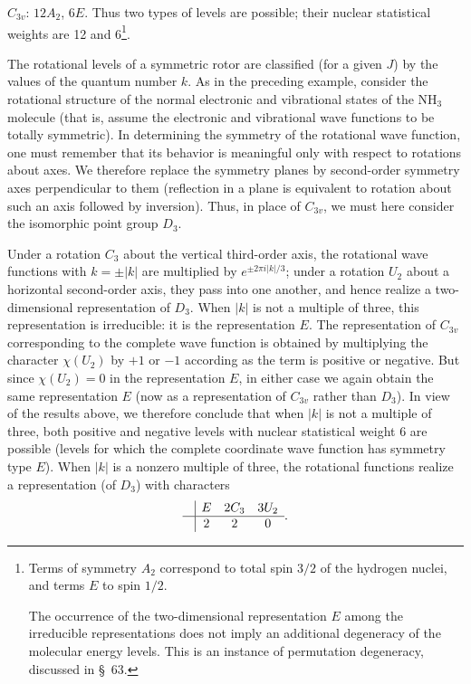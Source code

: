 $C_{3v}$: $12A_2$, $6E$. Thus two types of levels are possible; their nuclear statistical weights are 12 and 6\footnote{Terms of symmetry $A_2$ correspond to total spin $3/2$ of the hydrogen nuclei, and terms $E$ to spin $1/2$.

The occurrence of the two-dimensional representation $E$ among the irreducible representations does not imply an additional degeneracy of the molecular energy levels. This is an instance of permutation degeneracy, discussed in \S~63.}.

The rotational levels of a symmetric rotor are classified (for a given $J$) by the values of the quantum number $k$. As in the preceding example, consider the rotational structure of the normal electronic and vibrational states of the $\mathrm{NH}_3$ molecule (that is, assume the electronic and vibrational wave functions to be totally symmetric). In determining the symmetry of the rotational wave function, one must remember that its behavior is meaningful only with respect to rotations about axes. We therefore replace the symmetry planes by second-order symmetry axes perpendicular to them (reflection in a plane is equivalent to rotation about such an axis followed by inversion). Thus, in place of $C_{3v}$, we must here consider the isomorphic point group $D_3$.

Under a rotation $C_3$ about the vertical third-order axis, the rotational wave functions with $k=\pm|k|$ are multiplied by $e^{\pm2\pi i|k|/3}$; under a rotation $U_2$ about a horizontal second-order axis, they pass into one another, and hence realize a two-dimensional representation of $D_3$. When $|k|$ is not a multiple of three, this representation is irreducible: it is the representation $E$. The representation of $C_{3v}$ corresponding to the complete wave function is obtained by multiplying the character $\chi(U_2)$ by $+1$ or $-1$ according as the term is positive or negative. But since $\chi(U_2)=0$ in the representation $E$, in either case we again obtain the same representation $E$ (now as a representation of $C_{3v}$ rather than $D_3$). In view of the results above, we therefore conclude that when $|k|$ is not a multiple of three, both positive and negative levels with nuclear statistical weight 6 are possible (levels for which the complete coordinate wave function has symmetry type $E$). When $|k|$ is a nonzero multiple of three, the rotational functions realize a representation (of $D_3$) with characters
\[
\begin{array}{c|ccc}&E&2C_3&3U_2\\\hline&2&2&0\end{array}.
\]

